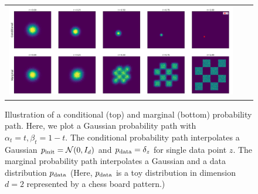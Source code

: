 \begin{figure}[!t]
    \centering
    \begin{tabular}{ccc}
\includegraphics[width=\textwidth]{figures/conditional_vs_marginal.png} &
    \end{tabular}
\caption{\label{fig:cond_marginal_path_histograms}Illustration of a conditional (top) and marginal (bottom) probability path. Here, we plot a Gaussian probability path with $\alpha_t=t,\beta_t=1-t$. The conditional probability path interpolates a Gaussian $p_{\rm{init}}=\mathcal{N}(0,I_d)$ and $p_{\rm{data}}=\delta_{z}$ for single data point $z$. The marginal probability path interpolates a Gaussian and a data distribution $p_{\rm{data}}$ (Here, $p_{\rm{data}}$ is a toy distribution in dimension $d=2$ represented by a chess board pattern.)}
\end{figure}
